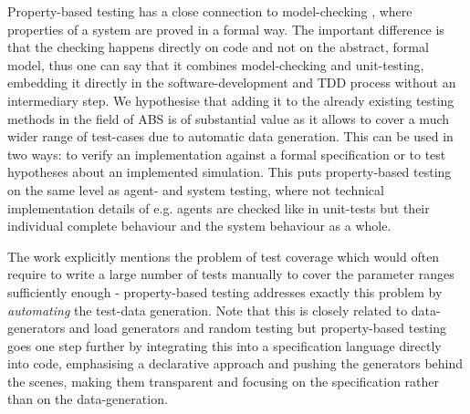 Property-based testing has a close connection to model-checking \cite{mcmillan_symbolic_1993}, where properties of a system are proved in a formal way. The important difference is that the checking happens directly on code and not on the abstract, formal model, thus one can say that it combines model-checking and unit-testing, embedding it directly in the software-development and TDD process without an intermediary step. We hypothesise that adding it to the already existing testing methods in the field of ABS is of substantial value as it allows to cover a much wider range of test-cases due to automatic data generation. This can be used in two ways: to verify an implementation against a formal specification or to test hypotheses about an implemented simulation. This puts property-based testing on the same level as agent- and system testing, where not technical implementation details of e.g. agents are checked like in unit-tests but their individual complete behaviour and the system behaviour as a whole.

The work \cite{onggo_test-driven_2016} explicitly mentions the problem of test coverage which would often require to write a large number of tests manually to cover the parameter ranges sufficiently enough - property-based testing addresses exactly this problem by \textit{automating} the test-data generation. Note that this is closely related to data-generators \cite{gurcan_generic_2013} and load generators and random testing \cite{burnstein_practical_2010} but property-based testing goes one step further by integrating this into a specification language directly into code, emphasising a declarative approach and pushing the generators behind the scenes, making them transparent and focusing on the specification rather than on the data-generation. 
